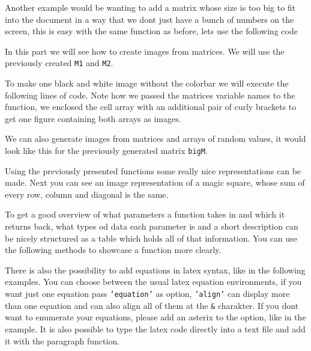 
Another example would be wanting to add a matrix whose size is too big to fit into the document in a way that we 
dont just have a bunch of numbers on the screen, this is easy with the same function as before, lets use the following code
 

In this part we will see how to create images from matrices. We will use the previously created {\tt M1} and {\tt M2}.


To make one black and white image without the colorbar we will execute the following lines of code. Note how we passed the 
matrices variable names to the function, we enclosed the cell array with an additional pair of curly brackets to get one 
figure containing both arrays as images.


We can also generate images from matrices and arrays of random values, it would look like this for the previously generated
matrix {\tt bigM}.


Using the previously presented functions some really nice representations can be made. Next you can see an image representation
of a magic square, whose sum of every row, column and diagonal is the same.


To get a good overview of what parameters a function takes in and which it returns back, what types od data each parameter is
and a short description can be nicely structured as a table which holds all of that information. You can use the following 
methods to showcase a function more clearly. 


There is also the possibility to add equations in latex syntax, like in the following examples. You can choose between the 
usual latex equation environments, if you want just one equation pass {\tt 'equation'} as option, {\tt 'align'} can display
more than one equation and can also align all of them at the {\tt \&} charakter. If you dont want to enumerate your equations, please
add an asterix to the option, like in the example. It is also possible to type the latex code directly into a text file and 
add it with the paragraph function.








